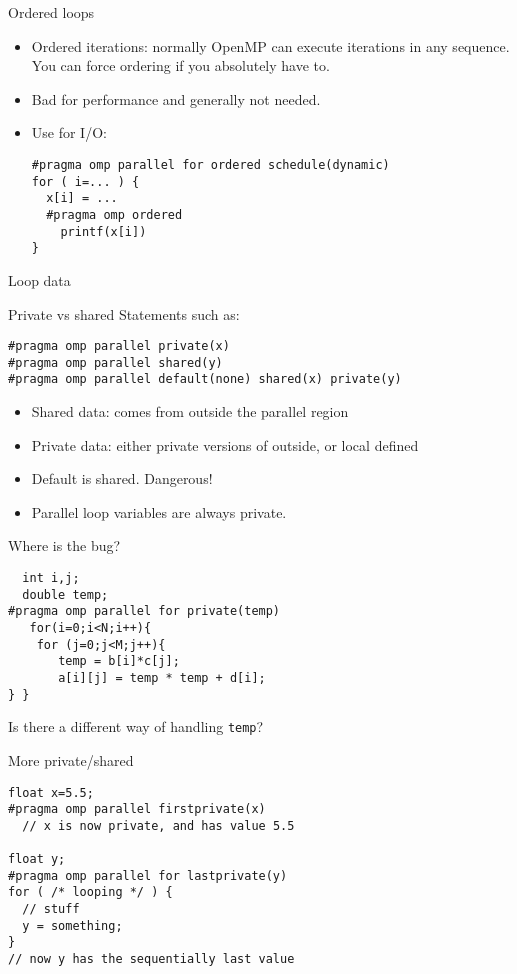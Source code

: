 \begin{numberedframe}{Ordered loops}
  \begin{itemize}
  \item Ordered iterations: normally OpenMP can execute iterations in
    any sequence.
    You can force ordering if you absolutely have to.
  \item Bad for performance and generally not needed.
  \item Use for I/O:
\begin{lstlisting}
#pragma omp parallel for ordered schedule(dynamic)
for ( i=... ) {
  x[i] = ...
  #pragma omp ordered
    printf(x[i])
}
\end{lstlisting}
  \end{itemize}
\end{numberedframe}

 {Loop data}

\begin{numberedframe}{Private vs shared}
Statements such as:
\begin{lstlisting}
#pragma omp parallel private(x)
#pragma omp parallel shared(y)
#pragma omp parallel default(none) shared(x) private(y)
\end{lstlisting}
  \begin{itemize}
  \item Shared data: comes from outside the parallel region
  \item Private data: either private versions of outside, or local defined
  \item Default is shared. Dangerous!
  \item Parallel loop variables are always private.
  \end{itemize}
\end{numberedframe}

\begin{numberedframe}{Where is the bug?}
\begin{lstlisting}
  int i,j;
  double temp;
#pragma omp parallel for private(temp)
   for(i=0;i<N;i++){
    for (j=0;j<M;j++){
       temp = b[i]*c[j];
       a[i][j] = temp * temp + d[i];
} }  
\end{lstlisting}
Is there a different way of handling \lstinline{temp}?
\end{numberedframe}

\begin{numberedframe}{More private/shared}
\begin{lstlisting}
float x=5.5;
#pragma omp parallel firstprivate(x)
  // x is now private, and has value 5.5

float y;
#pragma omp parallel for lastprivate(y)
for ( /* looping */ ) {
  // stuff
  y = something;
}
// now y has the sequentially last value
\end{lstlisting}
\end{numberedframe}

